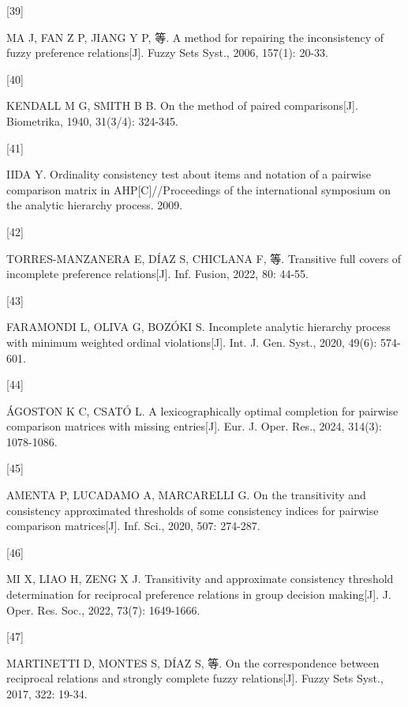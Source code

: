 \documentclass[
  letterpaper,
  DIV=11,
  numbers=noendperiod]{scrartcl}
\newlength{\cslhangindent}
\newlength{\csllabelwidth}
\newenvironment{CSLReferences}[2] %
 {\begin{list}{}{%
  \setlength{\itemindent}{0pt}
  \setlength{\leftmargin}{0pt}
  \setlength{\parsep}{0pt}
  \ifodd #1
   \setlength{\leftmargin}{\cslhangindent}
   \setlength{\itemindent}{-1\cslhangindent}
  \fi
  \setlength{\itemsep}{#2\baselineskip}}}
 {\end{list}}
\newcommand{\CSLLeftMargin}[1]{\parbox[t]{\csllabelwidth}{\strut#1\strut}}
\newcommand{\CSLRightInline}[1]{\parbox[t]{\linewidth - \csllabelwidth}{\strut#1\strut}}
\begin{document}
\begin{CSLReferences}{0}{0}
\CSLLeftMargin{{[}39{]} }%
\CSLRightInline{MA J, FAN Z P, JIANG Y P, 等. A method for repairing the
inconsistency of fuzzy preference relations{[}J{]}. Fuzzy Sets Syst.,
2006, 157(1): 20-33.}

\CSLLeftMargin{{[}40{]} }%
\CSLRightInline{KENDALL M G, SMITH B B. On the method of paired
comparisons{[}J{]}. Biometrika, 1940, 31(3/4): 324-345.}

\CSLLeftMargin{{[}41{]} }%
\CSLRightInline{IIDA Y. Ordinality consistency test about items and
notation of a pairwise comparison matrix in AHP{[}C{]}//Proceedings of
the international symposium on the analytic hierarchy process. 2009.}

\CSLLeftMargin{{[}42{]} }%
\CSLRightInline{TORRES-MANZANERA E, DÍAZ S, CHICLANA F, 等. Transitive
full covers of incomplete preference relations{[}J{]}. Inf. Fusion,
2022, 80: 44-55.}

\CSLLeftMargin{{[}43{]} }%
\CSLRightInline{FARAMONDI L, OLIVA G, BOZÓKI S. Incomplete analytic
hierarchy process with minimum weighted ordinal violations{[}J{]}. Int.
J. Gen. Syst., 2020, 49(6): 574-601.}

\CSLLeftMargin{{[}44{]} }%
\CSLRightInline{ÁGOSTON K C, CSATÓ L. A lexicographically optimal
completion for pairwise comparison matrices with missing entries{[}J{]}.
Eur. J. Oper. Res., 2024, 314(3): 1078-1086.}

\CSLLeftMargin{{[}45{]} }%
\CSLRightInline{AMENTA P, LUCADAMO A, MARCARELLI G. On the transitivity
and consistency approximated thresholds of some consistency indices for
pairwise comparison matrices{[}J{]}. Inf. Sci., 2020, 507: 274-287.}

\CSLLeftMargin{{[}46{]} }%
\CSLRightInline{MI X, LIAO H, ZENG X J. Transitivity and approximate
consistency threshold determination for reciprocal preference relations
in group decision making{[}J{]}. J. Oper. Res. Soc., 2022, 73(7):
1649-1666.}

\CSLLeftMargin{{[}47{]} }%
\CSLRightInline{MARTINETTI D, MONTES S, DÍAZ S, 等. On the
correspondence between reciprocal relations and strongly complete fuzzy
relations{[}J{]}. Fuzzy Sets Syst., 2017, 322: 19-34.}


\end{CSLReferences}
\end{document}
